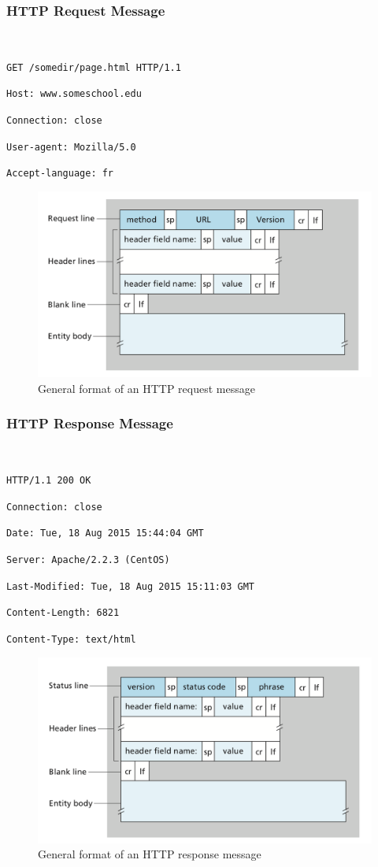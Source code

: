 \documentclass[11pt]{article}
\begin{document}
\subsubsection{HTTP Request Message}

~\ 

\texttt{GET /somedir/page.html HTTP/1.1}

\texttt{Host: www.someschool.edu}

\texttt{Connection: close}

\texttt{User-agent: Mozilla/5.0}

\texttt{Accept-language: fr}

\begin{figure}[h]
	\centering
	\includegraphics[width=0.8\linewidth]{images/HttpRequest.png}
	\caption{General format of an HTTP request message}
	\label{fig:HttpRequest}
\end{figure}

\subsubsection{HTTP Response Message}

~\

\texttt{HTTP/1.1 200 OK}

\texttt{Connection: close}

\texttt{Date: Tue, 18 Aug 2015 15:44:04 GMT}

\texttt{Server: Apache/2.2.3 (CentOS)}

\texttt{Last-Modified: Tue, 18 Aug 2015 15:11:03 GMT}

\texttt{Content-Length: 6821}

\texttt{Content-Type: text/html}

\begin{figure}[h]
	\centering
	\includegraphics[width=0.8\linewidth]{images/HttpResponse.png}
	\caption{General format of an HTTP response message}
	\label{fig:HttpResponse}
\end{figure}
\end{document}
